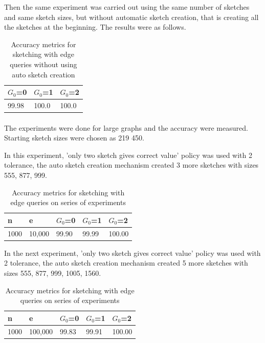 \documentclass[12pt]{report}
\numberwithin{figure}{section}
\numberwithin{table}{section}
\begin{document}
Then the same experiment was carried out using the same number of sketches and same sketch sizes, but without automatic sketch creation, that is creating all the sketches at the beginning. The results were as follows.

\begin{table}[H]
\centering
\begin{tabular}{|l|l|l|}
\hline
$G_0$=0 & $G_0$=1 & $G_0$=2 \\ \hline
99.98  &   100.0  &   100.0\\ \hline
\end{tabular}
\caption{Accuracy metrics for sketching with edge queries without using auto sketch creation}
\end{table}

\paragraph{}

The experiments were done for large graphs and the accuracy were measured. Starting sketch sizes were chosen as 219 450. 

In this experiment, 'only two sketch gives correct value' policy was used with 2 tolerance, the auto sketch creation mechanism created 3 more sketches with sizes 555, 877, 999.  

\begin{table}[H]
\centering
\begin{tabular}{|l|l|l|l|l|}
\hline
n    & e     & $G_0$=0 & $G_0$=1 & $G_0$=2 \\ \hline
1000 & 10,000 & 99.90   & 99.99   & 100.00   \\ \hline
\end{tabular}
\caption{Accuracy metrics for sketching with edge queries on series of experiments}
\end{table}

In the next experiment, 'only two sketch gives correct value' policy was used with 2 tolerance, the auto sketch creation mechanism created 5 more sketches with sizes 555, 877, 999, 1005, 1560.  

\begin{table}[H]
\centering
\begin{tabular}{|l|l|l|l|l|}
\hline
n    & e     & $G_0$=0 & $G_0$=1 & $G_0$=2 \\ \hline
1000 & 100,000 & 99.83   & 99.91   & 100.00   \\ \hline
\end{tabular}
\caption{Accuracy metrics for sketching with edge queries on series of experiments}
\end{table}
\end{document}
